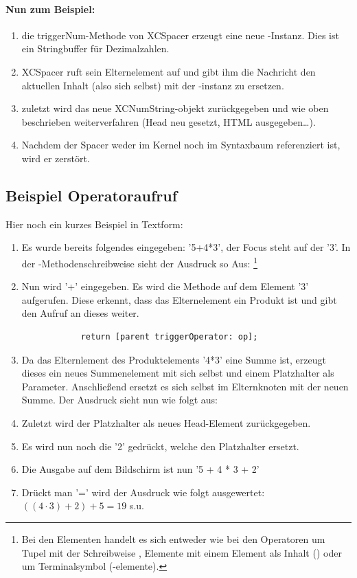 \paragraph{Nun zum Beispiel:}
\begin{enumerate}
	\item die triggerNum-Methode von XCSpacer erzeugt eine neue -Instanz.
		Dies ist ein Stringbuffer für Dezimalzahlen.
	\item XCSpacer ruft sein Elternelement auf und gibt ihm die Nachricht den aktuellen Inhalt (also sich selbst) mit der -instanz zu ersetzen.
	\item zuletzt wird das neue XCNumString-objekt zurückgegeben und wie oben beschrieben weiterverfahren (Head neu gesetzt, HTML ausgegeben\ldots).
	\item Nachdem der Spacer weder im Kernel noch im Syntaxbaum referenziert ist, wird er zerstört.
\end{enumerate}
\subsection{Beispiel Operatoraufruf}
Hier noch ein kurzes Beispiel in Textform:
\begin{enumerate}
	\item Es wurde bereits folgendes eingegeben: '5+4*3', der Focus steht auf der '3'.
		In der -Methodenschreibweise sieht der Ausdruck so Aus: 
		\footnote{Bei den Elementen handelt es sich entweder wie bei den Operatoren um Tupel 
			mit der Schreibweise , 
			Elemente mit einem Element als Inhalt () oder um Terminalsymbol (-elemente).
		}
	\item Nun  wird '+' eingegeben.
		Es wird die Methode  auf dem Element '3' aufgerufen. 
		Diese erkennt, dass das Elternelement ein Produkt ist und 
		gibt den Aufruf an dieses weiter.
		\begin{lstlisting}
			return [parent triggerOperator: op];
		\end{lstlisting}
	\item Da das Elternlement des Produktelements '4*3' eine Summe ist, 
		erzeugt dieses ein neues Summenelement mit sich selbst und einem Platzhalter als Parameter. Anschließend ersetzt es sich selbst im Elternknoten mit der neuen Summe. Der Ausdruck sieht nun wie folgt aus: 
	\item Zuletzt wird der Platzhalter als neues Head-Element zurückgegeben.
	\item Es wird nun noch die '2' gedrückt, welche den Platzhalter ersetzt.
	\item Die Ausgabe auf dem Bildschirm ist nun '5 + 4 * 3 + 2'
	\item Drückt man '=' wird der Ausdruck wie folgt ausgewertet: $((4 \cdot 3) + 2) + 5 = 19$ s.u.
\end{enumerate}


